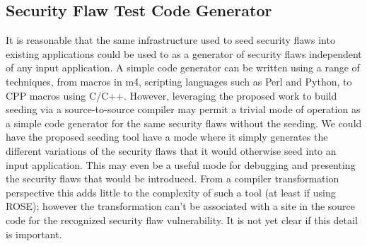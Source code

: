 \subsection{Security Flaw Test Code Generator}
         \label{sec:SecurityFlawGenerator}
         It is reasonable that the same infrastructure used to seed security flaws into
         existing applications could be used to as a generator of security flaws
         independent of any input application.  A simple code generator can be written
         using a range of techniques, from macros in m4, scripting languages such as Perl
         and Python, to CPP macros using C/C++.  However, leveraging the proposed work
         to build seeding via a source-to-source compiler may permit a trivial mode
         of operation as a simple code generator for the same security flaws without the 
         seeding.
         We could have the proposed seeding tool have a mode where it simply generates
         the different variations of the security flaws that it would otherwise seed into
         an input application.  This may even be a useful mode for debugging and
         presenting the security flaws that would be introduced.  From a compiler
         transformation perspective this adds little to the complexity of such a tool
         (at least if using ROSE); however the transformation can't be associated with
         a site in the source code for the recognized security flaw vulnerability. It is
         not yet clear if this detail is important.

